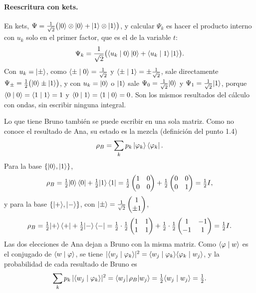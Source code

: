 \paragraph{Reescritura con kets.} En kets, $\Psi=\frac1{\sqrt2}\bigl(\lvert 0\rangle\otimes\lvert 0\rangle+\lvert 1\rangle\otimes\lvert 1\rangle\bigr)$, y calcular $\Psi_k$ es hacer el producto interno con $u_k$ solo en el primer factor, que es el de la variable $t$:
\[
  \Psi_k=\frac1{\sqrt2}\bigl(\langle u_k\mid 0\rangle\,\lvert 0\rangle+\langle u_k\mid 1\rangle\,\lvert 1\rangle\bigr).
\]
Con $u_k=\lvert \pm\rangle$, como $\langle \pm\mid 0\rangle=\frac1{\sqrt2}$ y $\langle \pm\mid 1\rangle=\pm\frac1{\sqrt2}$, sale directamente $\Psi_\pm=\frac12\bigl(\lvert 0\rangle\pm\lvert 1\rangle\bigr)$, y con $u_k=\lvert 0\rangle$ o $\lvert 1\rangle$ sale $\Psi_0=\frac1{\sqrt2}\lvert 0\rangle$ y $\Psi_1=\frac1{\sqrt2}\lvert 1\rangle$, porque $\langle 0\mid 0\rangle=\langle 1\mid 1\rangle=1$ y $\langle 0\mid 1\rangle=\langle 1\mid 0\rangle=0$. Son los mismos resultados del cálculo con ondas, sin escribir ninguna integral.

Lo que tiene Bruno también se puede escribir en una sola matriz. Como no conoce el resultado de Ana, su estado es la mezcla (definición del punto 1.4)
\[
  \rho_B=\sum_k p_k\,\lvert \varphi_k\rangle\bra{\varphi_k}.
\]
Para la base $\{\lvert 0\rangle,\lvert 1\rangle\}$,
\[
  \rho_B=\tfrac12\lvert 0\rangle\bra0+\tfrac12\lvert 1\rangle\bra1=\tfrac12\begin{pmatrix}1&0\\0&0\end{pmatrix}+\tfrac12\begin{pmatrix}0&0\\0&1\end{pmatrix}=\tfrac12 I,
\]
y para la base $\{\lvert +\rangle,\lvert -\rangle\}$, con $\lvert \pm\rangle=\frac1{\sqrt2}\begin{pmatrix}1\\\pm1\end{pmatrix}$,
\[
  \rho_B=\tfrac12\lvert +\rangle\bra++\tfrac12\lvert -\rangle\bra-=\tfrac12\cdot\tfrac12\begin{pmatrix}1&1\\1&1\end{pmatrix}+\tfrac12\cdot\tfrac12\begin{pmatrix}1&-1\\-1&1\end{pmatrix}=\tfrac12 I .
\]
Las dos elecciones de Ana dejan a Bruno con la misma matriz. Como $\langle \varphi\mid w\rangle$ es el conjugado de $\langle w\mid \varphi\rangle$, se tiene $|\langle w_j\mid \varphi_k\rangle|^2=\langle w_j\mid \varphi_k\rangle\langle \varphi_k\mid w_j\rangle$, y la probabilidad de cada resultado de Bruno es
\[
  \sum_k p_k\,|\langle w_j\mid \varphi_k\rangle|^2=\bra{w_j}\rho_B\lvert w_j\rangle=\tfrac12\langle w_j\mid w_j\rangle=\tfrac12 .
\]

